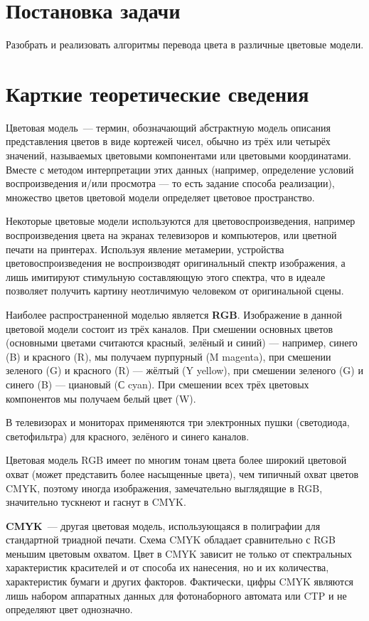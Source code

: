 \newpage
\section{Постановка задачи}
Разобрать и реализовать алгоритмы перевода цвета в различные цветовые модели.

\section{Карткие теоретические сведения}
Цветовая модель~--- термин, обозначающий абстрактную модель описания представления цветов в виде кортежей чисел, обычно из трёх или четырёх значений, называемых цветовыми компонентами или цветовыми координатами. Вместе с методом интерпретации этих данных (например, определение условий воспроизведения и/или просмотра — то есть задание способа реализации), множество цветов цветовой модели определяет цветовое пространство.

Некоторые цветовые модели используются для цветовоспроизведения, например воспроизведения цвета на экранах телевизоров и компьютеров, или цветной печати на принтерах. Используя явление метамерии, устройства цветовоспроизведения не воспроизводят оригинальный спектр изображения, а лишь имитируют стимульную составляющую этого спектра, что в идеале позволяет получить картину неотличимую человеком от оригинальной сцены.

Наиболее распространенной моделью является \textbf{RGB}. Изображение в данной цветовой модели состоит из трёх каналов. При смешении основных цветов (основными цветами считаются красный, зелёный и синий) — например, синего (B) и красного (R), мы получаем пурпурный (M magenta), при смешении зеленого (G) и красного (R) — жёлтый (Y yellow), при смешении зеленого (G) и синего (B) — циановый (С cyan). При смешении всех трёх цветовых компонентов мы получаем белый цвет (W).

В телевизорах и мониторах применяются три электронных пушки (светодиода, светофильтра) для красного, зелёного и синего каналов.

Цветовая модель RGB имеет по многим тонам цвета более широкий цветовой охват (может представить более насыщенные цвета), чем типичный охват цветов CMYK, поэтому иногда изображения, замечательно выглядящие в RGB, значительно тускнеют и гаснут в CMYK.

\textbf{CMYK}~--- другая цветовая модель, использующаяся в полиграфии для стандартной триадной печати. Схема CMYK обладает сравнительно с RGB меньшим цветовым охватом. Цвет в CMYK зависит не только от спектральных характеристик красителей и от способа их нанесения, но и их количества, характеристик бумаги и других факторов. Фактически, цифры CMYK являются лишь набором аппаратных данных для фотонаборного автомата или CTP и не определяют цвет однозначно.

